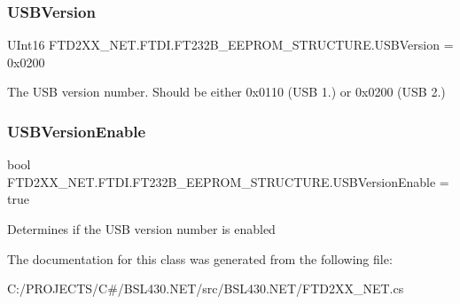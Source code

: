 \subsubsection{\texorpdfstring{USBVersion}{USBVersion}}
{\footnotesize\ttfamily U\+Int16 F\+T\+D2\+X\+X\+\_\+\+N\+E\+T.\+F\+T\+D\+I.\+F\+T232\+B\+\_\+\+E\+E\+P\+R\+O\+M\+\_\+\+S\+T\+R\+U\+C\+T\+U\+R\+E.\+U\+S\+B\+Version = 0x0200}



The U\+SB version number. Should be either 0x0110 (U\+SB 1.) or 0x0200 (U\+SB 2.) 

\mbox{\label{class_f_t_d2_x_x___n_e_t_1_1_f_t_d_i_1_1_f_t232_b___e_e_p_r_o_m___s_t_r_u_c_t_u_r_e_a3eb0833bf84b7d3b2c53f04e65a3ae6a}} 
\subsubsection{\texorpdfstring{USBVersionEnable}{USBVersionEnable}}
{\footnotesize\ttfamily bool F\+T\+D2\+X\+X\+\_\+\+N\+E\+T.\+F\+T\+D\+I.\+F\+T232\+B\+\_\+\+E\+E\+P\+R\+O\+M\+\_\+\+S\+T\+R\+U\+C\+T\+U\+R\+E.\+U\+S\+B\+Version\+Enable = true}



Determines if the U\+SB version number is enabled 



The documentation for this class was generated from the following file\+:\begin{DoxyCompactItemize}
\item 
C\+:/\+P\+R\+O\+J\+E\+C\+T\+S/\+C\#/\+B\+S\+L430.\+N\+E\+T/src/\+B\+S\+L430.\+N\+E\+T/F\+T\+D2\+X\+X\+\_\+\+N\+E\+T.\+cs\end{DoxyCompactItemize}

